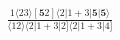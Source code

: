 \documentclass[varwidth, border=5pt]{standalone}
\begin{document}
\begin{my}
$\begin{gathered}
\scriptscriptstyle\frac{1⟨23⟩[𝟓2]⟨2|1+3|𝟓|𝟓⟩}{⟨12⟩⟨2|1+3|2]⟨2|1+3|4]}
\end{gathered}$
\end{my}
\end{document}
